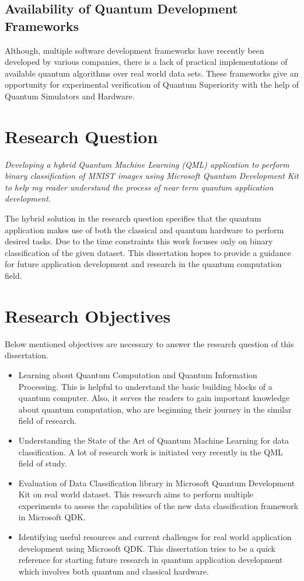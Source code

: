 \documentclass[english,a4paper,11pt,oneside,onecolumn]{book}
\begin{document}
\subsection{Availability of Quantum Development Frameworks}
Although, multiple software development frameworks have recently been developed \cite{cjgronlund_microsoft, asfaw_2020_learn} by various companies, there is a lack of practical implementations of available quantum algorithms over real world data sets. These frameworks give an opportunity for experimental verification of Quantum Superiority with the help of Quantum Simulators and Hardware.

\section{Research Question}
\label{sec:resQ}

\begin{displayquote}
\emph{Developing a hybrid Quantum Machine Learning (QML) application to perform binary classification of MNIST images using Microsoft Quantum Development Kit to help my reader understand the process of near term quantum application development.}
\end{displayquote}

The hybrid solution in the research question specifies that the quantum application makes use of both the classical and quantum hardware to perform desired tasks. Due to the time constraints this work focuses only on binary classification of the given dataset. This dissertation hopes to provide a guidance for future application development and research in the quantum computation field.

\section{Research Objectives}
\label{sec:resObj}
Below mentioned objectives are necessary to answer the research question of this dissertation.
\begin{itemize}
  \item Learning about Quantum Computation and Quantum Information Processing. This is helpful to understand the basic building blocks of a quantum computer. Also, it serves the readers to gain important knowledge about quantum computation, who are beginning their journey in the similar field of research.
  \item Understanding the State of the Art of Quantum Machine Learning for data classification. A lot of research work is initiated very recently in the QML field of study.
  \item Evaluation of Data Classification library in Microsoft Quantum Development Kit on real world dataset. This research aims to perform multiple experiments to assess the capabilities of the new data classification framework in Microsoft QDK.
  \item Identifying  useful resources and current challenges for real world application development using Microsoft QDK. This dissertation tries to be a quick reference for starting future research in quantum application development which involves both quantum and classical hardware.
\end{itemize}
\end{document}
